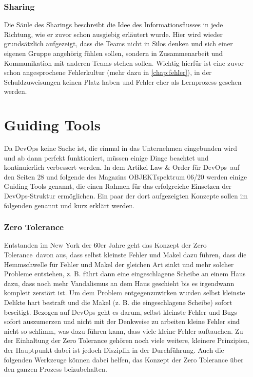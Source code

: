 \subsubsection*{Sharing}

Die Säule des Sharings beschreibt die Idee des Informationsflusses in jede Richtung, wie er zuvor schon ausgiebig erläutert wurde. Hier wird wieder grundsätzlich aufgezeigt, dass die Teams nicht in Silos denken und sich einer eigenen Gruppe angehörig fühlen sollen, sondern in Zusammenarbeit und Kommunikation mit anderen Teams stehen sollen. Wichtig hierfür ist eine zuvor schon angesprochene Fehlerkultur (mehr dazu in \autoref{chap:fehler}), in der Schuldzuweisungen keinen Platz haben und Fehler eher als Lernprozess gesehen werden.

\section{Guiding Tools}

Da \ac{DevOps} keine Sache ist, die einmal in das Unternehmen eingebunden wird und ab dann perfekt funktioniert, müssen einige Dinge beachtet und kontinuierlich verbessert werden. In dem Artikel \glqq Law \& Order für DevOps\grqq\ auf den Seiten 28 und folgende des Magazins OBJEKTspektrum 06/20 \cite{spektrum2} werden einige Guiding Tools genannt, die einen Rahmen für das erfolgreiche Einsetzen der \ac{DevOps}-Struktur ermöglichen. Ein paar der dort aufgezeigten Konzepte sollen im folgenden genannt und kurz erklärt werden.

\subsubsection*{Zero Tolerance}

Entstanden im New York der 60er Jahre geht das Konzept der \glqq Zero Tolerance\grqq\ davon aus, dass selbst kleinste Fehler und Makel dazu führen, dass die Hemmschwelle für Fehler und Makel der gleichen Art sinkt und mehr solcher Probleme entstehen, z. B. führt dann eine eingeschlagene Scheibe an einem Haus dazu, dass noch mehr Vandalismus an dem Haus geschieht bis es irgendwann komplett zerstört ist. Um dem Problem entgegenzuwirken wurden selbst kleinste Delikte hart bestraft und die Makel (z. B. die eingeschlagene Scheibe) sofort beseitigt. Bezogen auf \ac{DevOps} geht es darum, selbst kleinste Fehler und Bugs sofort auszumerzen und nicht mit der Denkweise zu arbeiten \glqq kleine Fehler sind nicht so schlimm\grqq , was dazu führen kann, dass viele kleine Fehler auftauchen. Zu der Einhaltung der Zero Tolerance gehören noch viele weitere, kleinere Prinzipien, der Hauptpunkt dabei ist jedoch Disziplin in der Durchführung. Auch die folgenden Werkzeuge können dabei helfen, das Konzept der Zero Tolerance über den ganzen Prozess beizubehalten.

